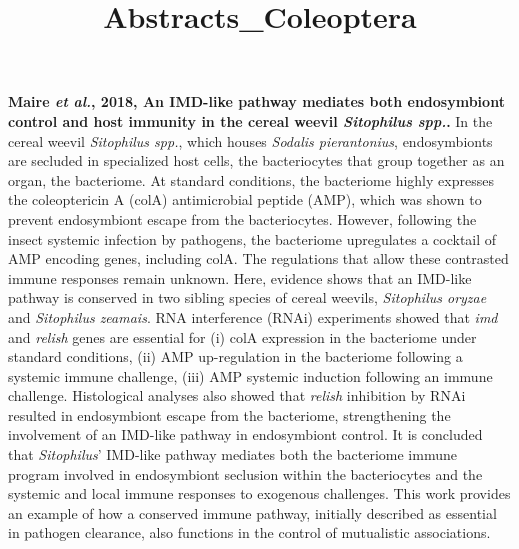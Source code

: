 \documentclass[11pt]{article}
\title{Abstracts_Coleoptera}
\author{}
\date{}
\begin{document}
\begin{sloppypar}
\maketitle

\linenumbers

\textbf{Maire \textit{et al.}, 2018, An IMD-like pathway mediates both endosymbiont control and host immunity in the cereal weevil \textit{Sitophilus spp.}.} \newline
In the cereal weevil \textit{Sitophilus spp.}, which houses \textit{Sodalis pierantonius}, endosymbionts are secluded in specialized host cells, the bacteriocytes that group together as an organ, the bacteriome. 
At standard conditions, the bacteriome highly expresses the coleoptericin A (colA) antimicrobial peptide (AMP), which was shown to prevent endosymbiont escape from the bacteriocytes. 
However, following the insect systemic infection by pathogens, the bacteriome upregulates a cocktail of AMP encoding genes, including colA. 
The regulations that allow these contrasted immune responses remain unknown. 
Here, evidence shows that an IMD-like pathway is conserved in two sibling species of cereal weevils, \textit{Sitophilus oryzae} and \textit{Sitophilus zeamais}. 
RNA interference (RNAi) experiments showed that \textit{imd} and \textit{relish} genes are essential for 
(i) colA expression in the bacteriome under standard conditions, 
(ii) AMP up-regulation in the bacteriome following a systemic immune challenge, 
(iii) AMP systemic induction following an immune challenge. 
Histological analyses also showed that \textit{relish} inhibition by RNAi resulted in endosymbiont escape from the bacteriome, strengthening the involvement of an IMD-like pathway in endosymbiont control. 
It is concluded that \textit{Sitophilus}’ IMD-like pathway mediates both the bacteriome immune program involved in endosymbiont seclusion within the bacteriocytes and the systemic and local immune responses to exogenous challenges. 
This work provides an example of how a conserved immune pathway, initially described as essential in pathogen clearance, also functions in the control of mutualistic associations.
  
\end{sloppypar}
\end{document}
